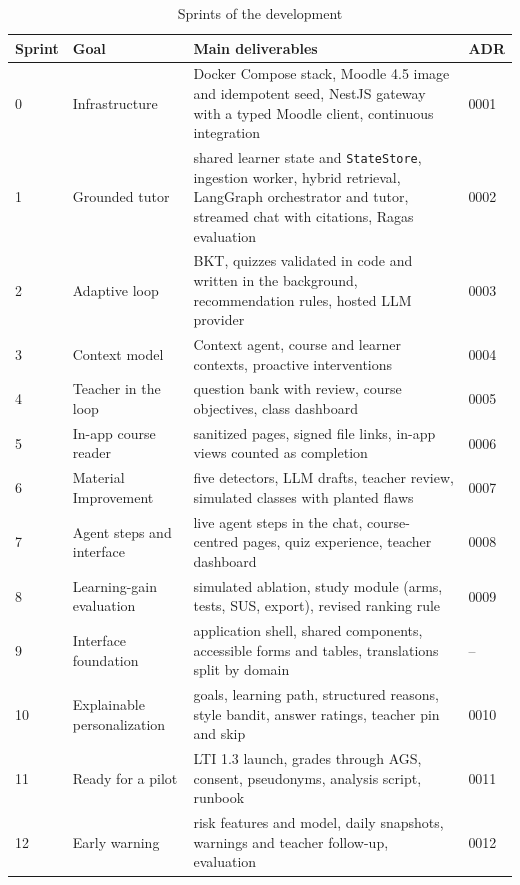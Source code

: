 \begin{table}[htbp]
\centering
\caption{Sprints of the development}
\label{tab-sprints}
\scriptsize
\begin{tabularx}{\textwidth}{@{}L{0.9cm}L{3.2cm}YL{1.1cm}@{}}
\toprule
\textbf{Sprint} & \textbf{Goal} & \textbf{Main deliverables} & \textbf{ADR} \\
 & Infrastructure & Docker Compose stack, Moodle 4.5 image and idempotent seed, NestJS gateway with a typed Moodle client, continuous integration & 0001 \\
1 & Grounded tutor & shared learner state and \texttt{StateStore}, ingestion worker, hybrid retrieval, LangGraph orchestrator and tutor, streamed chat with citations, Ragas evaluation & 0002 \\
2 & Adaptive loop & BKT, quizzes validated in code and written in the background, recommendation rules, hosted LLM provider & 0003 \\
3 & Context model & Context agent, course and learner contexts, proactive interventions & 0004 \\
4 & Teacher in the loop & question bank with review, course objectives, class dashboard & 0005 \\
5 & In-app course reader & sanitized pages, signed file links, in-app views counted as completion & 0006 \\
6 & Material Improvement & five detectors, LLM drafts, teacher review, simulated classes with planted flaws & 0007 \\
7 & Agent steps and interface & live agent steps in the chat, course-centred pages, quiz experience, teacher dashboard & 0008 \\
8 & Learning-gain evaluation & simulated ablation, study module (arms, tests, SUS, export), revised ranking rule & 0009 \\
9 & Interface foundation & application shell, shared components, accessible forms and tables, translations split by domain & -- \\
10 & Explainable personalization & goals, learning path, structured reasons, style bandit, answer ratings, teacher pin and skip & 0010 \\
11 & Ready for a pilot & LTI 1.3 launch, grades through AGS, consent, pseudonyms, analysis script, runbook & 0011 \\
12 & Early warning & risk features and model, daily snapshots, warnings and teacher follow-up, evaluation & 0012 \\
\bottomrule
\end{tabularx}
\end{table}


